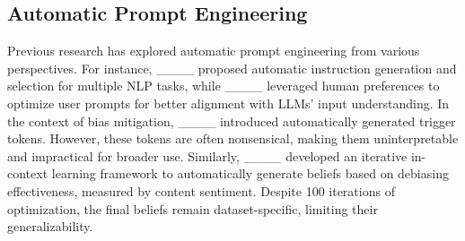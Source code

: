 \subsection{Automatic Prompt Engineering}
Previous research has explored automatic prompt engineering from various perspectives. For instance, ____ proposed automatic instruction generation and selection for multiple NLP tasks, while ____ leveraged human preferences to optimize user prompts for better alignment with LLMs' input understanding.
In the context of bias mitigation, ____ introduced automatically generated trigger tokens. However, these tokens are often nonsensical, making them uninterpretable and impractical for broader use. Similarly, ____ developed an iterative in-context learning framework to automatically generate beliefs based on debiasing effectiveness, measured by content sentiment. Despite 100 iterations of optimization, the final beliefs remain dataset-specific, limiting their generalizability.